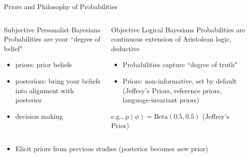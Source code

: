 \documentclass[presentation,9pt,xcolor=dvipsnames]{beamer}
\begin{document}
\begin{frame}[label={sec:org5dd7829}]{Priors and Philosophy of Probabilities}
\begin{columns}
\begin{column}{0.4\columnwidth}
\begin{block}{Subjective Personalist Bayesians}
Probabilities are your ``degree of belief"
\begin{itemize}
\item priors: prior beliefs
\item posteriors: bring your beliefs into alignment with posterior
\item \alert{decision making}
\end{itemize}
\end{block}
\end{column}
\begin{column}{0.6\columnwidth}
\begin{block}{Objective Logical Bayesians}
Probabilities are continuous extension of Aristolean logic, deductive
\begin{itemize}
\item Probabilities capture ``degree of truth"
\item Priors: non-informative, set by \alert{default} (Jeffrey's Priors, reference priors, language-invariant priors)
\end{itemize}
e.g., \(p(\phi)=\text{Beta}(0.5,0.5)\) (Jeffrey's Prior)
\end{block}
\end{column}
\end{columns}
\begin{block}{}
\begin{itemize}
\item Elicit priors from previous studies (posterior becomes new prior)
\end{itemize}
\end{block}
\end{frame}
\end{document}
